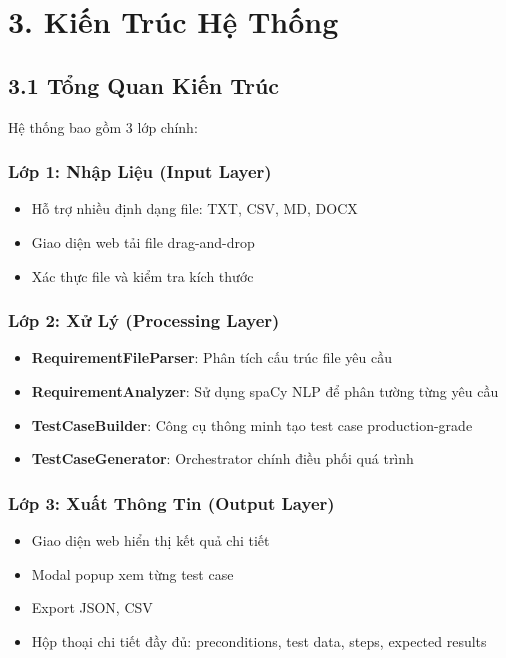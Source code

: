 \documentclass[14pt,a4paper]{article}
\begin{document}
\section{3. Kiến Trúc Hệ Thống}

\subsection{3.1 Tổng Quan Kiến Trúc}

Hệ thống bao gồm 3 lớp chính:

\subsubsection{Lớp 1: Nhập Liệu (Input Layer)}
\begin{itemize}
    \item Hỗ trợ nhiều định dạng file: TXT, CSV, MD, DOCX
    \item Giao diện web tải file drag-and-drop
    \item Xác thực file và kiểm tra kích thước
\end{itemize}

\subsubsection{Lớp 2: Xử Lý (Processing Layer)}
\begin{itemize}
    \item \textbf{RequirementFileParser}: Phân tích cấu trúc file yêu cầu
    \item \textbf{RequirementAnalyzer}: Sử dụng spaCy NLP để phân tường từng yêu cầu
    \item \textbf{TestCaseBuilder}: Công cụ thông minh tạo test case production-grade
    \item \textbf{TestCaseGenerator}: Orchestrator chính điều phối quá trình
\end{itemize}

\subsubsection{Lớp 3: Xuất Thông Tin (Output Layer)}
\begin{itemize}
    \item Giao diện web hiển thị kết quả chi tiết
    \item Modal popup xem từng test case
    \item Export JSON, CSV
    \item Hộp thoại chi tiết đầy đủ: preconditions, test data, steps, expected results
\end{itemize}
\end{document}
